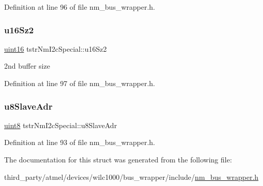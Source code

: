 Definition at line 96 of file nm\+\_\+bus\+\_\+wrapper.\+h.

\mbox{\label{structtstrNmI2cSpecial_a852145ab9573a13c932ba625d2f2ba17}} 
\subsubsection{\texorpdfstring{u16\+Sz2}{u16Sz2}}
{\footnotesize\ttfamily \hyperlink{group__DataT_ga1daa745171fc6e31d942c161422a76f9}{uint16} tstr\+Nm\+I2c\+Special\+::u16\+Sz2}

2nd buffer size 

Definition at line 97 of file nm\+\_\+bus\+\_\+wrapper.\+h.

\mbox{\label{structtstrNmI2cSpecial_a6d5ae4c091612c4a530f76e8aa83dc3f}} 
\subsubsection{\texorpdfstring{u8\+Slave\+Adr}{u8SlaveAdr}}
{\footnotesize\ttfamily \hyperlink{group__DataT_ga4df709a77647e870bbf1d955b8edc9a6}{uint8} tstr\+Nm\+I2c\+Special\+::u8\+Slave\+Adr}



Definition at line 93 of file nm\+\_\+bus\+\_\+wrapper.\+h.



The documentation for this struct was generated from the following file\+:\begin{DoxyCompactItemize}
\item 
third\+\_\+party/atmel/devices/wilc1000/bus\+\_\+wrapper/include/\hyperlink{nm__bus__wrapper_8h}{nm\+\_\+bus\+\_\+wrapper.\+h}\end{DoxyCompactItemize}
